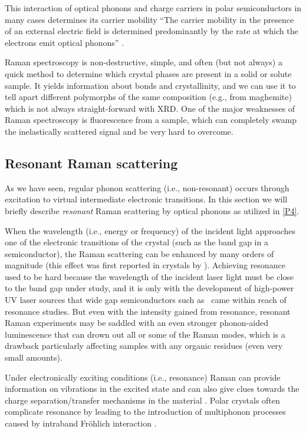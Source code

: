 \documentclass[draft,webedition,openright,titles,swedish,english]{LuaUUThesis}\usepackage[]{graphicx}\usepackage[]{xcolor}
\newcommand{\ie}{i.e.}
\newcommand{\eg}{e.g.}
\begin{document}
This interaction of optical phonons and charge carriers in polar semiconductors
in many cases determines its carrier mobility \cite{Stroscio2005}
\enquote{The carrier mobility in the presence of an external electric field is determined
predominantly by the rate at which the electrons emit optical phonons} \cite{Stroscio2005}.

Raman spectroscopy is non-destructive, simple, and often (but not always) a quick method
to determine which crystal phases are present in a solid or solute sample.
It yields information about bonds and crystallinity, and we can use it to tell apart
different polymorphs of the same composition (\eg,  from maghemite)
which is not always straight-forward with \gls{XRD}.
One of the major weaknesses of Raman spectroscopy is fluorescence from a sample,
which can completely swamp the inelastically scattered signal and be very hard
to overcome.



\subsection{Resonant Raman scattering}
\label{methods:resonant-Raman}

As we have seen, regular phonon scattering (\ie, non-resonant) occurs through
excitation to virtual intermediate electronic transitions.
In this section we will briefly describe \emph{resonant} Raman scattering by optical phonons
as utilized in \cref{P4}.

When the wavelength (\ie, energy or frequency) of the incident light approaches one
of the electronic transitions of the crystal (such as the band gap in a semiconductor),
the Raman scattering can be enhanced by many orders of magnitude (this effect
was first reported in crystals by \textcite{Ovander1962}).
Achieving resonance used to be hard because the wavelength of the incident
laser light must be close to the band gap under study, and it is only with the
development of high-power \gls{UV} laser sources
that wide gap semiconductors such as \ZnO\ came within reach of resonance studies.
But even with the intensity gained from resonance, resonant Raman experiments
may be saddled with an even stronger phonon-aided luminescence that can drown out
all or some of the Raman modes, which is a drawback particularly affecting samples
with any organic residues (even very small amounts).

Under electronically exciting conditions (\ie, resonance) Raman can provide
information on vibrations in the excited state and can also give clues towards
the charge separation/transfer mechanisms in the material \cite{Rahman2020a}.
Polar crystals often complicate resonance by
leading to the introduction of multiphonon processes caused by
intraband Fröhlich interaction \cite{Cardona1983}.
\end{document}
